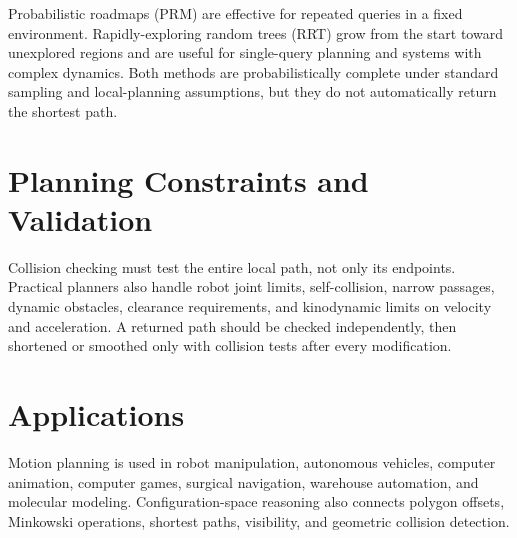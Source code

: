 Probabilistic roadmaps (PRM) are effective for repeated queries in a fixed
environment. Rapidly-exploring random trees (RRT) grow from the start toward
unexplored regions and are useful for single-query planning and systems with
complex dynamics. Both methods are probabilistically complete under standard
sampling and local-planning assumptions, but they do not automatically return
the shortest path.

\section{Planning Constraints and Validation}
\label{sec:motion_planning_validation}

Collision checking must test the entire local path, not only its endpoints.
Practical planners also handle robot joint limits, self-collision, narrow
passages, dynamic obstacles, clearance requirements, and kinodynamic limits on
velocity and acceleration. A returned path should be checked independently,
then shortened or smoothed only with collision tests after every modification.

\section{Applications}

Motion planning is used in robot manipulation, autonomous vehicles, computer
animation, computer games, surgical navigation, warehouse automation, and
molecular modeling. Configuration-space reasoning also connects polygon
offsets, Minkowski operations, shortest paths, visibility, and geometric
collision detection.

